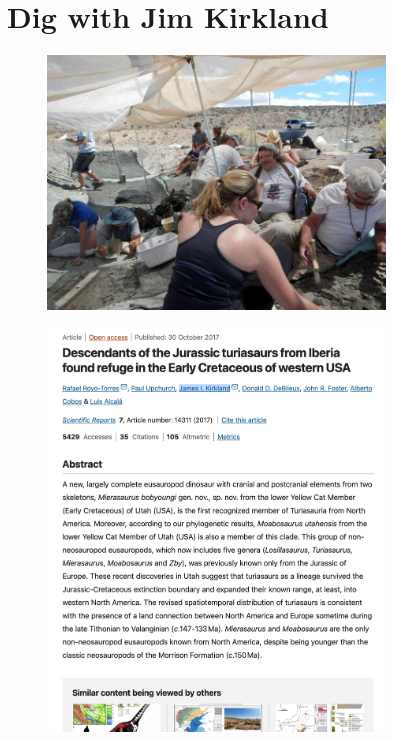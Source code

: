 \documentclass[12pt]{book}
\begin{document}
\section{Dig with Jim Kirkland}

\begin{figure}
    \centering
    \includegraphics[width=0.8\textwidth]{figures/dig.jpg}
\end{figure}

\begin{figure}
    \centering
    \includegraphics[width=0.8\textwidth]{figures/nature.png}
\end{figure}
\end{document}
